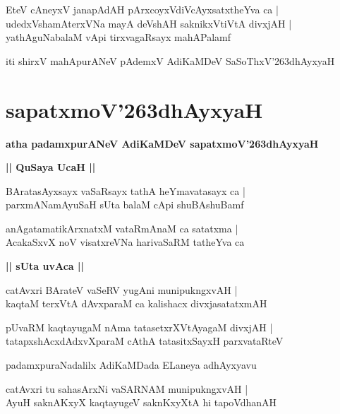 \documentclass[twoside,12pt,openright]{book}
\def\S{\char'263}
\newcounter{shloka}[chapter]
\def\uvaca#1{\centerline{{\large\textbf{#1}}}}
\begin{document}
\begin{shloka}
EteV cAneyxV janapAdAH pArxcoyxVdiVcAyxsatxtheYva ca |\\
udedxVshamAterxVNa mayA deVshAH saknikxVtiVtA divxjAH |\\
yathAguNabalaM vApi tirxvagaRsayx mahAPalamf
\end{shloka}

\begin{center}
iti shirxV mahApurANeV pAdemxV AdiKaMDeV SaSoThxV\S dhAyxyaH
\end{center}

\chapter{sapatxmoV\S dhAyxyaH}

\begin{center}
{\LARGE\bfseries atha padamxpurANeV AdiKaMDeV sapatxmoV\S dhAyxyaH}
\end{center}

\uvaca{|| QuSaya UcaH ||}

\begin{shloka}
BAratasAyxsayx vaSaRsayx tathA heYmavatasayx ca |\\
parxmANamAyuSaH sUta balaM cApi shuBAshuBamf
\end{shloka}

\begin{shloka}
anAgatamatikArxnatxM vataRmAnaM ca satatxma |\\
AcakaSxvX noV visatxreVNa harivaSaRM tatheYva ca
\end{shloka}

\uvaca{|| sUta uvAca ||}

\begin{shloka}
catAvxri BArateV vaSeRV yugAni munipukngxvAH |\\
kaqtaM terxVtA dAvxparaM ca kalishacx divxjasatatxmAH
\end{shloka}

\begin{shloka}
pUvaRM kaqtayugaM nAma tatasetxrXVtAyagaM divxjAH |\\
tatapxshAcxdAdxvXparaM cAthA tatasitxSayxH parxvataRteV
\end{shloka}

\begin{center}
padamxpuraNadalilx AdiKaMDada ELaneya adhAyxyavu
\end{center}

\begin{shloka}
catAvxri tu sahasArxNi vaSARNAM munipukngxvAH |\\
AyuH saknAKxyX kaqtayugeV saknKxyXtA hi tapoVdhanAH
\end{shloka}
\end{document}
